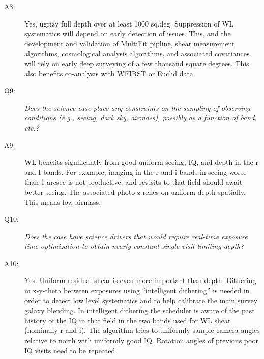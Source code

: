\begin{description}
\item[A8:] Yes, ugrizy full depth over at least 1000 sq.deg. Suppression
of WL systematics will depend on early detection of issues. This, and
the development and validation of MultiFit pipline, shear measurement
algorithms, cosmological analysis algorithms, and associated covariances
will rely on early deep surveying of a few thousand square degrees. This
also benefits co-analysis with WFIRST or Euclid data.

\item[Q9:] {\it Does the science case place any constraints on the
sampling of observing conditions (e.g., seeing, dark sky, airmass),
possibly as a function of band, etc.?}

\item[A9:] WL benefits significantly from good uniform seeing, IQ, and
depth in the r and I bands. For example, imaging in the r and i bands in
seeing worse than 1 arcsec is not productive, and revisits to that field
should await better seeing. The associated photo-z relies on uniform
depth spatially. This means low airmass.

\item[Q10:] {\it Does the case have science drivers that would require
real-time exposure time optimization to obtain nearly constant
single-visit limiting depth?}

\item[A10:] Yes. Uniform residual shear is even more important than
depth. Dithering in x-y-theta between exposures using “intelligent
dithering” is needed in order to detect low level systematics and to
help calibrate the main survey galaxy blending. In intelligent dithering
the scheduler is aware of the past history of the IQ in that field in
the two bands used for WL shear (nominally r and i). The algorithm tries
to uniformly sample camera angles relative to north with uniformly good
IQ. Rotation angles of previous poor IQ visits need to be repeated.

\end{description}


